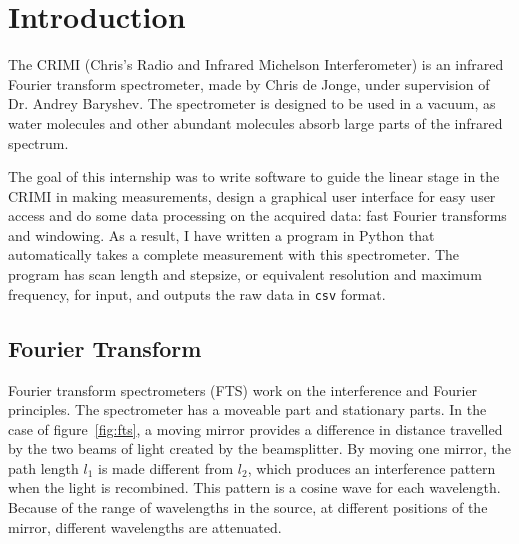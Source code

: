 
\section{Introduction}
The CRIMI (Chris's Radio and Infrared Michelson Interferometer) is an infrared Fourier transform spectrometer, made by Chris de Jonge, under supervision of Dr. Andrey Baryshev. The spectrometer is designed to be used in a vacuum, as water molecules and other abundant molecules absorb large parts of the infrared spectrum.

The goal of this internship was to write software to guide the linear stage in the CRIMI in making measurements, design a graphical user interface for easy user access and do some data processing on the acquired data: fast Fourier transforms and windowing. As a result, I have written a program in Python that automatically takes a complete measurement with this spectrometer. The program has scan length and stepsize, or equivalent resolution and maximum frequency, for input, and outputs the raw data in \verb!csv! format.


\subsection{Fourier Transform}

Fourier transform spectrometers (FTS) work on the interference and Fourier principles. The spectrometer has a moveable part and stationary parts. In the case of figure~\ref{fig:fts}, a moving mirror provides a difference in distance travelled by the two beams of light created by the beamsplitter. By moving one mirror, the path length $l_1$ is made different from $l_2$, which produces an interference pattern when the light is recombined. This pattern is a cosine wave for each wavelength. Because of the range of wavelengths in the source, at different positions of the mirror, different wavelengths are attenuated.

